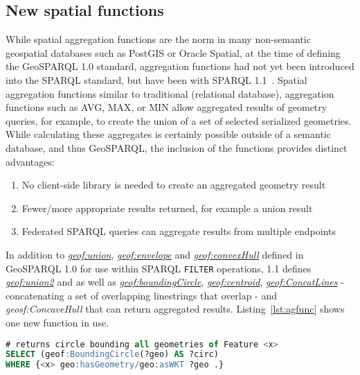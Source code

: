 \documentclass[runningheads]{llncs}
\begin{document}
\subsection{New spatial functions}\label{sec:newfunctions}
While spatial aggregation functions are the norm in many non-semantic geospatial databases such as PostGIS or Oracle Spatial, 
at the time of defining the GeoSPARQL 1.0 standard, aggregation functions had not yet been introduced into the SPARQL standard,
but have been with SPARQL 1.1~\cite{w3c_sparql_working_group_sparql_2013}. Spatial aggregation functions 
similar to traditional (relational database), aggregation functions such as AVG, MAX, or MIN allow aggregated results of geometry 
queries, for example, to create the union of a set of selected serialized geometries. While calculating these aggregates is 
certainly possible outside of a semantic database, and thus GeoSPARQL, the inclusion of the functions provides distinct advantages:

\begin{enumerate}
    \item No client-side library is needed to create an aggregated geometry result
    \item Fewer/more appropriate results returned, for example a union result
    \item Federated SPARQL queries can aggregate results from multiple endpoints
\end{enumerate}

In addition to \href{http://www.opengis.net/def/function/geosparql/union}{\emph{geof:union}}, \href{http://www.opengis.net/def/function/geosparql/envelope}{\emph{geof:envelope}} and \href{http://www.opengis.net/def/function/geosparql/convexHull}{\emph{geof:convexHull}} defined in GeoSPARQL 1.0 
for use within SPARQL \texttt{FILTER} operations, 1.1 defines \href{http://www.opengis.net/def/function/geosparql/union2}{\emph{geof:union2}} and 
as well as \href{http://www.opengis.net/def/function/geosparql/boundingCircle}{\emph{geof:boundingCircle}}, \href{http://www.opengis.net/def/function/geosparql/centroid}{\emph{geof:centroid}}, \href{http://www.opengis.net/def/function/geosparql/concatLines}{\emph{geof:ConcatLines}} - concatenating a set of overlapping linestrings 
that overlap - and \emph{geosf:ConcaveHull} that can return aggregated results. Listing~\ref{lst:agfunc} shows one new function in use.

\small
\begin{lstlisting}[caption=Aggregation Function example SPARQL query,label=lst:agfunc,language=sql,frame=single,basicstyle=\ttfamily,showstringspaces=false]
# returns circle bounding all geometries of Feature <x>
SELECT (geof:BoundingCircle(?geo) AS ?circ)
WHERE {<x> geo:hasGeometry/geo:asWKT ?geo .}
\end{lstlisting}
\normalsize
\end{document}
